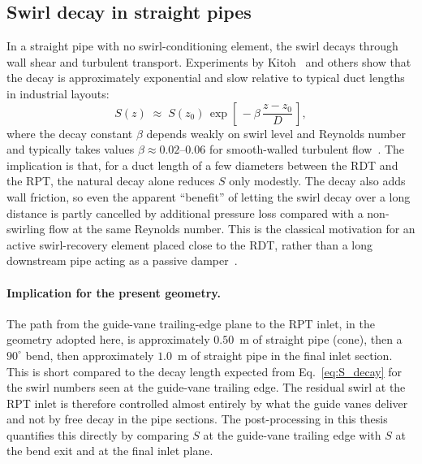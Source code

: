 \subsection{Swirl decay in straight pipes}
\label{sec:theory_swirl_decay}
 
In a straight pipe with no swirl-conditioning element, the swirl decays through wall shear and turbulent transport. Experiments by Kitoh~\cite{Kitoh1991} and others show that the decay is approximately exponential and slow relative to typical duct lengths in industrial layouts:
\begin{equation}
S(z) \;\approx\; S(z_0)\,\exp\!\left[\,-\beta\,\frac{z - z_0}{D}\,\right],
\label{eq:S_decay}
\end{equation}
where the decay constant $\beta$ depends weakly on swirl level and Reynolds number and typically takes values $\beta \approx 0.02$--$0.06$ for smooth-walled turbulent flow~\cite{Kitoh1991, Beaubert2016}. The implication is that, for a duct length of a few diameters between the RDT and the RPT, the natural decay alone reduces $S$ only modestly. The decay also adds wall friction, so even the apparent ``benefit'' of letting the swirl decay over a long distance is partly cancelled by additional pressure loss compared with a non-swirling flow at the same Reynolds number. This is the classical motivation for an active swirl-recovery element placed close to the RDT, rather than a long downstream pipe acting as a passive damper~\cite{Andersen2014, Nguyen2024}.
 
\paragraph{Implication for the present geometry.}
The path from the guide-vane trailing-edge plane to the RPT inlet, in the geometry adopted here, is approximately $0.50$~m of straight pipe (cone), then a $90^\circ$ bend, then approximately $1.0$~m of straight pipe in the final inlet section. This is short compared to the decay length expected from Eq.~\ref{eq:S_decay} for the swirl numbers seen at the guide-vane trailing edge. The residual swirl at the RPT inlet is therefore controlled almost entirely by what the guide vanes deliver and not by free decay in the pipe sections. The post-processing in this thesis quantifies this directly by comparing $S$ at the guide-vane trailing edge with $S$ at the bend exit and at the final inlet plane.
 

